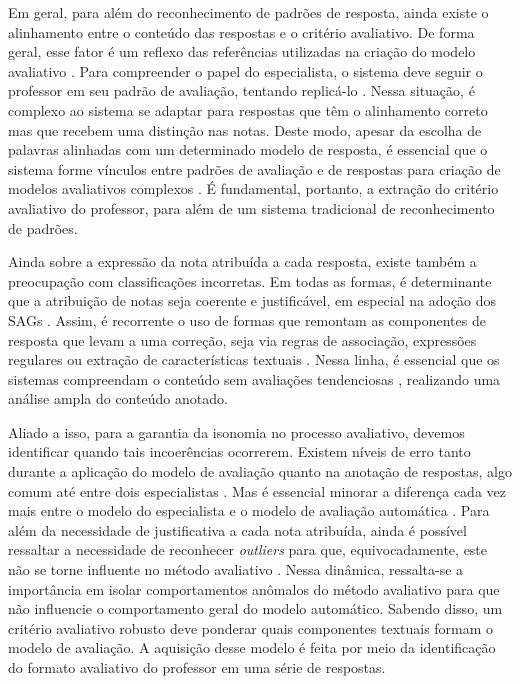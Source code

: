 Em geral, para além do reconhecimento de padrões de resposta, ainda existe o alinhamento entre o conteúdo das respostas e o critério avaliativo. De forma geral, esse fator é um reflexo das referências utilizadas na criação do modelo avaliativo \cite{krithika2015}. Para compreender o papel do especialista, o sistema deve seguir o professor em seu padrão de avaliação, tentando replicá-lo \cite{jordan2012, funayama2020}. Nessa situação, é complexo ao sistema se adaptar para respostas que têm o alinhamento correto mas que recebem uma distinção nas notas. Deste modo, apesar da escolha de palavras alinhadas com um determinado modelo de resposta, é essencial que o sistema forme vínculos entre padrões de avaliação e de respostas para criação de modelos avaliativos complexos \cite{higgins2014}. É fundamental, portanto, a extração do critério avaliativo do professor, para além de um sistema tradicional de reconhecimento de padrões.

Ainda sobre a expressão da nota atribuída a cada resposta, existe também a preocupação com classificações incorretas. Em todas as formas, é determinante que a atribuição de notas seja coerente e justificável, em especial na adoção dos SAGs \cite{funayama2020}. Assim, é recorrente o uso de formas que remontam as componentes de resposta que levam a uma correção, seja via regras de associação, expressões regulares ou extração de características textuais \cite{chakraborty2017, kumar2019}. Nessa linha, é essencial que os sistemas compreendam o conteúdo sem avaliações tendenciosas \cite{azad2020}, realizando uma análise ampla do conteúdo anotado.

Aliado a isso, para a garantia da isonomia no processo avaliativo, devemos identificar quando tais incoerências ocorrerem. Existem níveis de erro tanto durante a aplicação do modelo de avaliação quanto na anotação de respostas, algo comum até entre dois especialistas \cite{artstein2008, pado2021}. Mas é essencial minorar a diferença cada vez mais entre o modelo do especialista e o modelo de avaliação automática \cite{condor2020}. Para além da necessidade de justificativa a cada nota atribuída, ainda é possível ressaltar a necessidade de reconhecer \textit{outliers} para que, equivocadamente, este não se torne influente no método avaliativo \cite{ding2020}. Nessa dinâmica, ressalta-se a importância em isolar comportamentos anômalos do método avaliativo para que não influencie o comportamento geral do modelo automático. Sabendo disso, um critério avaliativo robusto deve ponderar quais componentes textuais formam o modelo de avaliação. A aquisição desse modelo é feita por meio da identificação do formato avaliativo do professor em uma série de respostas. 

